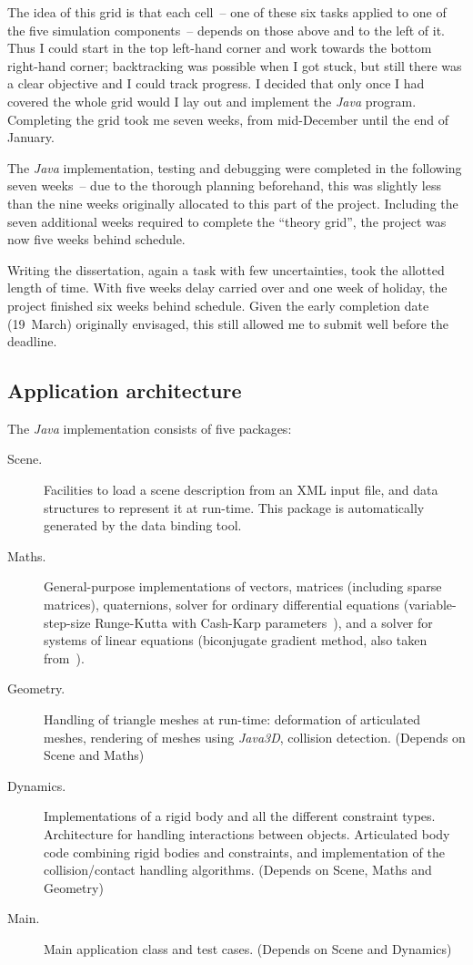 The idea of this grid is that each cell~-- one of these six tasks applied to one of the five
simulation components~-- depends on those above and to the left of it. Thus I could start in the
top left-hand corner and work towards the bottom right-hand corner; backtracking was possible when
I got stuck, but still there was a clear objective and I could track progress. I decided that only
once I had covered the whole grid would I lay out and implement the \textsl{Java} program.
Completing the grid took me seven weeks, from mid-December until the end of January.

The \textsl{Java} implementation, testing and debugging were completed in the following seven
weeks~-- due to the thorough planning beforehand, this was slightly less than the nine weeks
originally allocated to this part of the project. Including the seven additional weeks required to
complete the ``theory grid'', the project was now five weeks behind schedule.

Writing the dissertation, again a task with few uncertainties, took the allotted length of time.
With five weeks delay carried over and one week of holiday, the project finished six weeks behind
schedule. Given the early completion date (19~March) originally envisaged, this still
allowed me to submit well before the deadline.


\subsection{Application architecture\label{architecture}}

The \textsl{Java} implementation consists of five packages:

\begin{description}
\item[Scene.] Facilities to load a scene description from an XML input file, and data structures
    to represent it at run-time. This package is automatically generated by the data binding tool.
\item[Maths.] General-purpose implementations of vectors, matrices (including sparse matrices),
    quaternions, solver for ordinary differential equations (variable-step-size Runge-Kutta with
    Cash-Karp parameters~\cite{NRinC}), and a solver for systems of linear equations (biconjugate
    gradient method, also taken from~\cite{NRinC}).
\item[Geometry.] Handling of triangle meshes at run-time: deformation of articulated meshes,
    rendering of meshes using \textsl{Java3D}, collision detection. (Depends on Scene and Maths)
\item[Dynamics.] Implementations of a rigid body and all the different constraint types.
    Architecture for handling interactions between objects. Articulated body code combining
    rigid bodies and constraints, and implementation of the collision/contact handling algorithms.
    (Depends on Scene, Maths and Geometry)
\item[Main.] Main application class and test cases. (Depends on Scene and Dynamics)
\end{description}


